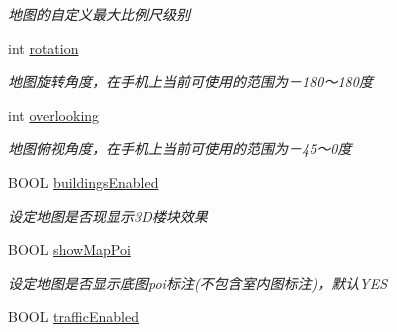 \begin{DoxyCompactItemize}
\begin{DoxyCompactList}\small\item\em 地图的自定义最大比例尺级别 \end{DoxyCompactList}\item 
\hypertarget{interface_b_m_k_map_view_a344d3d4be5d00adfc22feaa2ab6869c4}{}int \hyperlink{interface_b_m_k_map_view_a344d3d4be5d00adfc22feaa2ab6869c4}{rotation}\label{interface_b_m_k_map_view_a344d3d4be5d00adfc22feaa2ab6869c4}

\begin{DoxyCompactList}\small\item\em 地图旋转角度，在手机上当前可使用的范围为－180～180度 \end{DoxyCompactList}\item 
\hypertarget{interface_b_m_k_map_view_a8ae6f6cf221ea4f14923150d8974f997}{}int \hyperlink{interface_b_m_k_map_view_a8ae6f6cf221ea4f14923150d8974f997}{overlooking}\label{interface_b_m_k_map_view_a8ae6f6cf221ea4f14923150d8974f997}

\begin{DoxyCompactList}\small\item\em 地图俯视角度，在手机上当前可使用的范围为－45～0度 \end{DoxyCompactList}\item 
\hypertarget{interface_b_m_k_map_view_abccbae8b8f7182769b8e0b69a4383ceb}{}B\+O\+O\+L \hyperlink{interface_b_m_k_map_view_abccbae8b8f7182769b8e0b69a4383ceb}{buildings\+Enabled}\label{interface_b_m_k_map_view_abccbae8b8f7182769b8e0b69a4383ceb}

\begin{DoxyCompactList}\small\item\em 设定地图是否现显示3\+D楼块效果 \end{DoxyCompactList}\item 
\hypertarget{interface_b_m_k_map_view_a26be634d93e06efd2d7268a99bcca52f}{}B\+O\+O\+L \hyperlink{interface_b_m_k_map_view_a26be634d93e06efd2d7268a99bcca52f}{show\+Map\+Poi}\label{interface_b_m_k_map_view_a26be634d93e06efd2d7268a99bcca52f}

\begin{DoxyCompactList}\small\item\em 设定地图是否显示底图poi标注(不包含室内图标注)，默认\+Y\+E\+S \end{DoxyCompactList}\item 
\hypertarget{interface_b_m_k_map_view_a513d0877fb66681b10ad7a4ed1346cb7}{}B\+O\+O\+L \hyperlink{interface_b_m_k_map_view_a513d0877fb66681b10ad7a4ed1346cb7}{traffic\+Enabled}\label{interface_b_m_k_map_view_a513d0877fb66681b10ad7a4ed1346cb7}


\end{DoxyCompactItemize}
